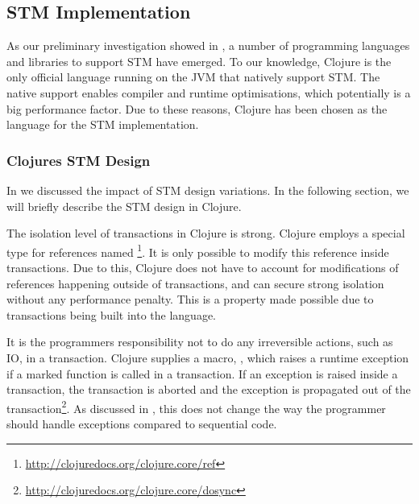 \subsection{\ac{STM} Implementation}
As our preliminary investigation showed in , a number of programming languages and libraries to support \ac{STM} have emerged. To our knowledge, Clojure is the only official language running on the \ac{JVM} that natively support \ac{STM}. The native support enables compiler and runtime optimisations, which potentially is a big performance factor. Due to these reasons, Clojure has been chosen as the language for the \ac{STM} implementation.


\subsubsection{Clojures \acs{STM} Design}
In  we discussed the impact of \ac{STM} design variations. In the following section, we will briefly describe the \ac{STM} design in Clojure.

The isolation level of transactions in Clojure is strong. Clojure employs a special type for references named \footnote{\url{http://clojuredocs.org/clojure.core/ref}}. It is only possible to modify this reference  inside transactions. Due to this, Clojure does not have to account for modifications of references happening outside of transactions, and can secure strong isolation without any performance penalty. This is a property made possible due to transactions being built into the language. 

It is the programmers responsibility not to do any irreversible actions, such as \ac{IO}, in a transaction. Clojure supplies a macro, , which raises a runtime exception if a marked function is called in a transaction. If an exception is raised inside a transaction, the transaction is aborted and the exception is propagated out of the transaction\footnote{\url{http://clojuredocs.org/clojure.core/dosync}}. As discussed in , this does not change the way the programmer should handle exceptions compared to sequential code. 

